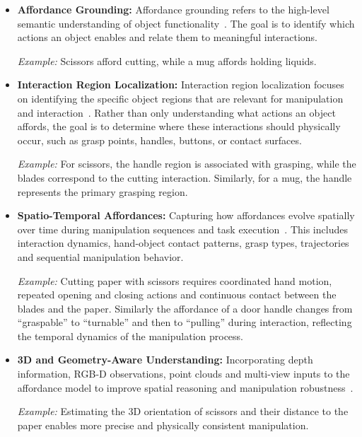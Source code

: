 \begin{itemize}
    \item \textbf{Affordance Grounding:} 
    Affordance grounding refers to the high-level semantic understanding of object functionality~\cite{Goyal2021HumanHA, Koppula2014PhysicallyGS}. The goal is to identify which actions an object enables and relate them to meaningful interactions.

    \textit{Example:} Scissors afford cutting, while a mug affords holding liquids.

    \item \textbf{Interaction Region Localization:} Interaction region localization focuses on identifying the specific object regions that are relevant for manipulation and interaction~\cite{Fang2018Demo2VecRO, Luo2021LearningVA}. Rather than only understanding what actions an object affords, the goal is to determine where these interactions should physically occur, such as grasp points, handles, buttons, or contact surfaces.
    
    \textit{Example:} For scissors, the handle region is associated with grasping, while the blades correspond to the cutting interaction. Similarly, for a mug, the handle represents the primary grasping region.

    \item \textbf{Spatio-Temporal Affordances:} 
    Capturing how affordances evolve spatially over time during manipulation sequences and task execution~\cite{Koppula2014PhysicallyGS, Ji2021DetectingHR}. 
    This includes interaction dynamics, hand-object contact patterns, grasp types, trajectories and sequential manipulation behavior.

    \textit{Example:} Cutting paper with scissors requires coordinated hand motion, repeated opening and closing actions and continuous contact between the blades and the paper. 
    Similarly the affordance of a door handle changes from ``graspable'' to ``turnable'' and then to ``pulling'' during interaction, reflecting the temporal dynamics of the manipulation process.

    \item \textbf{3D and Geometry-Aware Understanding:} 
    Incorporating depth information, RGB-D observations, point clouds and multi-view inputs to the affordance model to improve spatial reasoning and manipulation robustness~\cite{Do2017AffordanceNetAE}.

    \textit{Example:} Estimating the 3D orientation of scissors and their distance to the paper enables more precise and physically consistent manipulation.
\end{itemize}



